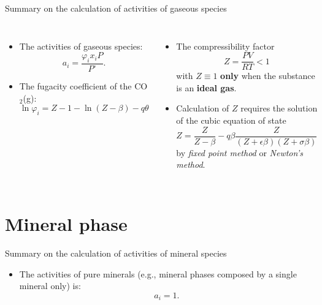 \begin{frame}{Summary on the calculation of activities of gaseous species}
\begin{columns}[t]

\begin{itemize}[<+->]
\item  The \alert{activities of gaseous species}:
\[
a_{i}=\frac{\varphi_{i}x_{i}P}{P^{\circ}}.
\]
\item The \alert{fugacity coefficient} of the CO$_{2}$(g):
\[
\ln\varphi_{i}=Z-1-\ln(Z-\beta)-q\theta
\]
\end{itemize}

\begin{itemize}[<+->]
\item  The \alert{compressibility factor} 
\[
Z=\frac{PV}{RT} < 1
\]
with $Z\equiv1$ \textbf{only} when the substance is an \textbf{ideal gas}.
%
\item Calculation of $Z$ requires the solution of the \alert{cubic equation of state}
\[
Z=\frac{Z}{Z-\beta}-q\beta\frac{Z}{(Z+\epsilon\beta)(Z+\sigma\beta)}
\]
by \emph{fixed point method} or \emph{Newton's method}.
\end{itemize}
\end{columns}

\end{frame}
%
\section{Mineral phase}
%
%
\begin{frame}{Summary on the calculation of activities of mineral species}
\begin{itemize}
\item The activities of pure minerals (e.g., mineral phases composed by
a single mineral only) is:
\[
a_{i}=1.
\]
\end{itemize}
\end{frame}

